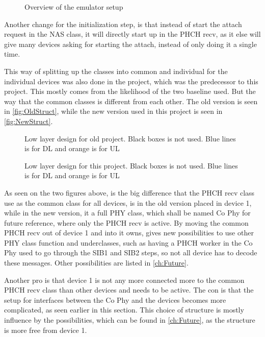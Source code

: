 \begin{figure}[H]
\centering
\resizebox{0.5\textwidth}{!}{
}
\caption{Overview of the emulator setup}
\label{fig:InitNew}
\end{figure}

Another change for the initialization step, is that instead of start the attach request in the NAS class, it will directly start up in the PHCH recv, as it else will give many devices asking for starting the attach, instead of only doing it a single time.

This way of splitting up the classes into common and individual for the individual devices was also done in the project, which was the predecessor to this project. This mostly comes from the likelihood of the two baseline used. But the way that the common classes is different from each other. The old version is seen in \autoref{fig:OldStruct}, while the new version used in this project is seen in \autoref{fig:NewStruct}.

\begin{figure}[H]
\centering
\resizebox{0.5\textwidth}{!}{
}
\caption{Low layer design for old project. Black boxes is not used. Blue lines is for DL and orange is for UL}
\label{fig:OldStruct}
\end{figure}

\begin{figure}[H]
\centering
\resizebox{0.5\textwidth}{!}{
}
\caption{Low layer design for this project. Black boxes is not used. Blue lines is for DL and orange is for UL}
\label{fig:NewStruct}
\end{figure}

As seen on the two figures above, is the big difference that the PHCH recv class use as the common class for all devices, is in the old version placed in device 1, while in the new version, it a full PHY class, which shall be named Co Phy for future reference, where only the PHCH recv is active. By moving the common PHCH recv out of device 1 and into it owns, gives new possibilities to use other PHY class function and underclasses, such as having a PHCH worker in the Co Phy used to go through the SIB1 and SIB2 steps, so not all device has to decode these messages. Other possibilities are listed in \autoref{ch:Future}. 

Another pro is that device 1 is not any more connected more to the common PHCH recv class than other devices and needs to be active. The con is that the setup for interfaces between the Co Phy and the devices becomes more complicated, as seen earlier in this section. This choice of structure is mostly influence by the possibilities, which can be found in \autoref{ch:Future}, as the structure is more free from device 1.

